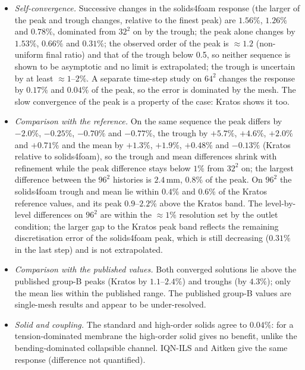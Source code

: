 \begin{itemize}
	\item \emph{Self-convergence.} Successive changes in the solids4foam response (the larger of the peak and trough changes, relative to the finest peak) are $1.56\%$, $1.26\%$ and $0.78\%$, dominated from $32^2$ on by the trough; the peak alone changes by $1.53\%$, $0.66\%$ and $0.31\%$; the observed order of the peak is $\approx1.2$ (non-uniform final ratio) and that of the trough below 0.5, so neither sequence is shown to be asymptotic and no limit is extrapolated; the trough is uncertain by at least $\approx1$--$2\%$. A separate time-step study on $64^2$ changes the response by $0.17\%$ and $0.04\%$ of the peak, so the error is dominated by the mesh. The slow convergence of the peak is a property of the case: Kratos shows it too.
	\item \emph{Comparison with the reference.} On the same sequence the peak differs by $-2.0\%$, $-0.25\%$, $-0.70\%$ and $-0.77\%$, the trough by $+5.7\%$, $+4.6\%$, $+2.0\%$ and $+0.71\%$ and the mean by $+1.3\%$, $+1.9\%$, $+0.48\%$ and $-0.13\%$ (Kratos relative to solids4foam), so the trough and mean differences shrink with refinement while the peak difference stays below $1\%$ from $32^2$ on; the largest difference between the $96^2$ histories is $2.4\,\mathrm{mm}$, $0.8\%$ of the peak. On $96^2$ the solids4foam trough and mean lie within $0.4\%$ and $0.6\%$ of the Kratos reference values, and its peak $0.9$--$2.2\%$ above the Kratos band. The level-by-level differences on $96^2$ are within the $\approx1\%$ resolution set by the outlet condition; the larger gap to the Kratos peak band reflects the remaining discretisation error of the solids4foam peak, which is still decreasing ($0.31\%$ in the last step) and is not extrapolated.
	\item \emph{Comparison with the published values.} Both converged solutions lie above the published group-B peaks (Kratos by $1.1$--$2.4\%$) and troughs (by $4.3\%$); only the mean lies within the published range. The published group-B values are single-mesh results and appear to be under-resolved.
	\item \emph{Solid and coupling.} The standard and high-order solids agree to $0.04\%$: for a tension-dominated membrane the high-order solid gives no benefit, unlike the bending-dominated collapsible channel. IQN-ILS and Aitken give the same response (difference not quantified).

\end{itemize}
